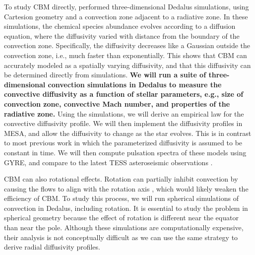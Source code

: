 To study CBM directly, \citet{Lecoanet_2016a} performed three-dimensional Dedalus simulations, using Cartesion geometry and a convection zone adjacent to a radiative zone. In these simulations, the chemical species abundance evolves according to a diffusion equation, where the diffusivity varied with distance from the boundary of the convection zone. Specifically, the diffusivity decreases like a Gaussian outside the convection zone, i.e., much faster than exponentially. This shows that CBM can accurately modeled as a spatially varying diffusivity, and that this diffusivity can be determined directly from simulations. \textbf{We will run a suite of three-dimensional convection simulations in Dedalus to measure the convective diffusivity as a function of stellar parameters, e.g., size of convection zone, convective Mach number, and properties of the radiative zone.} Using the simulations, we will derive an empirical law for the convective diffusivity profile. We will then implement the diffusivity profiles in MESA, and allow the diffusivity to change as the star evolves. {\color{green} This is in contrast to most previous work in which the parameterized diffusivity is assumed to be constant in time.} We will then compute pulsation spectra of these models using GYRE, and compare to the latest TESS asteroseismic observations \citep[similar to][]{moravveji:15,Ghasemi_2016}.

CBM can also  rotational effects. Rotation can partially inhibit convection by causing the flows to align with the rotation axis \cite[e.g.,][]{Featherstone_2016}, which would likely weaken the efficiency of CBM. To study this process, we will run spherical simulations of convection in Dedalus, including rotation. It is essential to study the problem in spherical geometry because the effect of rotation is different near the equator than near the pole. Although these simulations are computationally expensive, their analysis is not conceptually difficult as we can use the same strategy to derive radial diffusivity profiles.
